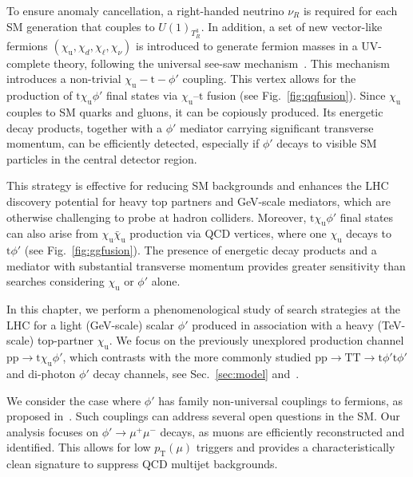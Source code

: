 To ensure anomaly cancellation, a right-handed neutrino $\nu_R$ is required for each SM generation that couples to $U(1)_{T^3_R}$. In addition, a set of new vector-like fermions $(\chi_\mathrm{u}, \chi_d, \chi_\ell, \chi_\nu)$ is introduced to generate fermion masses in a UV-complete theory, following the universal see-saw mechanism~\parencite{Berezhiani, Chang1987, Davidson1987, Rajpoot1987, Babu1989, Babu1990}. This mechanism introduces a non-trivial $\chi_\mathrm{u} - \mathrm{t} -\phi'$ coupling. This vertex allows for the production of $\mathrm{t}\chi_\mathrm{u} \phi'$ final states via $\chi_\mathrm{u}$--$\mathrm{t}$ fusion (see Fig.~\ref{fig:qqfusion}). Since $\chi_\mathrm{u}$ couples to SM quarks and gluons, it can be copiously produced. Its energetic decay products, together with a $\phi'$ mediator carrying significant transverse momentum, can be efficiently detected, especially if $\phi'$ decays to visible SM particles in the central detector region.

This strategy is effective for reducing SM backgrounds and enhances the LHC discovery potential for heavy top partners and GeV-scale mediators, which are otherwise challenging to probe at hadron colliders. Moreover, $\mathrm{t}\chi_\mathrm{u} \phi'$ final states can also arise from $\chi_\mathrm{u}\bar\chi_\mathrm{u}$ production via QCD vertices, where one $\chi_\mathrm{u}$ decays to $\mathrm{t}\phi'$ (see Fig.~\ref{fig:ggfusion}). The presence of energetic decay products and a mediator with substantial transverse momentum provides greater sensitivity than searches considering $\chi_\mathrm{u}$ or $\phi'$ alone.

In this chapter, we perform a phenomenological study of search strategies at the LHC for a light (GeV-scale) scalar $\phi'$ produced in association with a heavy (TeV-scale) top-partner $\chi_\mathrm{u}$. We focus on the previously unexplored production channel $\mathrm{pp}\to \mathrm{t}\chi_\mathrm{u} \phi'$, which contrasts with the more commonly studied $\mathrm{pp}\to \mathrm{T}\mathrm{T}\to \mathrm{t}\phi'\mathrm{t}\phi'$ and di-photon $\phi'$ decay channels, see Sec.~\ref{sec:model} and~\parencite{Bhardwaj_2022, Bhardwaj_2022_2, Bardhan_2023, Banerjee_2016, Alves_2024}.

We consider the case where $\phi'$ has family non-universal couplings to fermions, as proposed in~\parencite{Dutta2020}. Such couplings can address several open questions in the SM. Our analysis focuses on $\phi'\to\mu^+\mu^-$ decays, as muons are efficiently reconstructed and identified. This allows for low $p_{\mathrm{T}}(\mu)$ triggers and provides a characteristically clean signature to suppress QCD multijet backgrounds.

